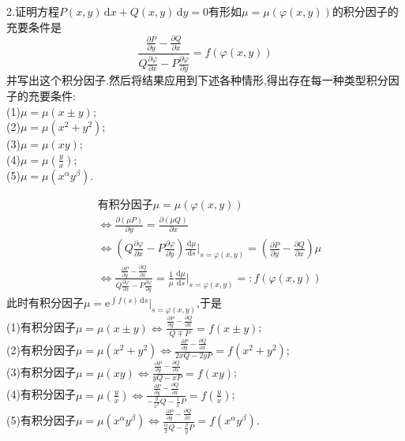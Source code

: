 \documentclass[titlepage,11pt,a4paper,twoside]{report}
\makeatletter
\newcommand\diff{\,\mathrm{d}}
\newcommand\e{\mathrm{e}}
\renewenvironment{proof}{\par
	\pushQED{\qed}%
	\normalfont \topsep1\p@\@plus6\p@\relax
	\trivlist
	\item\relax
	{\hspace*{\parindent}{\heiti 证明}\@addpunct{:}}\hspace\labelsep\ignorespaces
}{%
	\popQED\endtrivlist\@endpefalse
}
\makeatother
\begin{document}
2.证明方程$P(x,y)\diff x+Q(x,y)\diff y=0$有形如$\mu=\mu(\varphi(x,y))$的积分因子的充要条件是
\[\frac{\frac{\partial P}{\partial y}-\frac{\partial Q}{\partial x}}{Q\frac{\partial\varphi}{\partial x}-P\frac{\partial\varphi}{\partial y}}=f(\varphi(x,y))\]
并写出这个积分因子.然后将结果应用到下述各种情形,得出存在每一种类型积分因子的充要条件:\\
(1)$\mu=\mu(x\pm y)$;\\
(2)$\mu=\mu(x^2+y^2)$;\\
(3)$\mu=\mu(xy)$;\\
(4)$\mu=\mu(\frac{y}{x})$;\\
(5)$\mu=\mu(x^{\alpha}y^{\beta})$.
\begin{proof}\[\begin{split}
&\mbox{有积分因子}\mu=\mu(\varphi(x,y))\\
&\Longleftrightarrow\frac{\partial(\mu P)}{\partial y}=\frac{\partial(\mu Q)}{\partial x}\\
&\Longleftrightarrow\left(Q\frac{\partial\varphi}{\partial x}-P\frac{\partial\varphi}{\partial y}\right)\frac{\diff\mu}{\diff s}\bigg|_{s=\varphi(x,y)}=\left(\frac{\partial P}{\partial y}-\frac{\partial Q}{\partial x}\right)\mu\\
&\Longleftrightarrow\frac{\frac{\partial P}{\partial y}-\frac{\partial Q}{\partial x}}{Q\frac{\partial\varphi}{\partial x}-P\frac{\partial\varphi}{\partial y}}=\frac{1}{\mu}\frac{\diff\mu}{\diff s}\bigg|_{s=\varphi(x,y)}=:f(\varphi(x,y))
\end{split}\]
此时有积分因子$\mu=\e^{\int f(s)\diff s}|_{s=\varphi(x,y)}$,于是\\
(1)有积分因子$\mu=\mu(x\pm y)\Longleftrightarrow\frac{\frac{\partial P}{\partial y}-\frac{\partial Q}{\partial x}}{Q\mp P}=f(x\pm y)$;\\
(2)有积分因子$\mu=\mu(x^2+y^2)\Longleftrightarrow\frac{\frac{\partial P}{\partial y}-\frac{\partial Q}{\partial x}}{2xQ-2yP}=f(x^2+y^2)$;\\
(3)有积分因子$\mu=\mu(xy)\Longleftrightarrow\frac{\frac{\partial P}{\partial y}-\frac{\partial Q}{\partial x}}{yQ-xP}=f(xy)$;\\
(4)有积分因子$\mu=\mu(\frac{y}{x})\Longleftrightarrow\frac{\frac{\partial P}{\partial y}-\frac{\partial Q}{\partial x}}{-\frac{y}{x^2}Q-\frac{1}{x}P}=f(\frac{y}{x})$;\\
(5)有积分因子$\mu=\mu(x^{\alpha}y^{\beta})\Longleftrightarrow\frac{\frac{\partial P}{\partial y}-\frac{\partial Q}{\partial x}}{\frac{\alpha}{x}Q-\frac{\beta}{y}P}=f(x^{\alpha}y^{\beta})$.
\end{proof}
\end{document}
